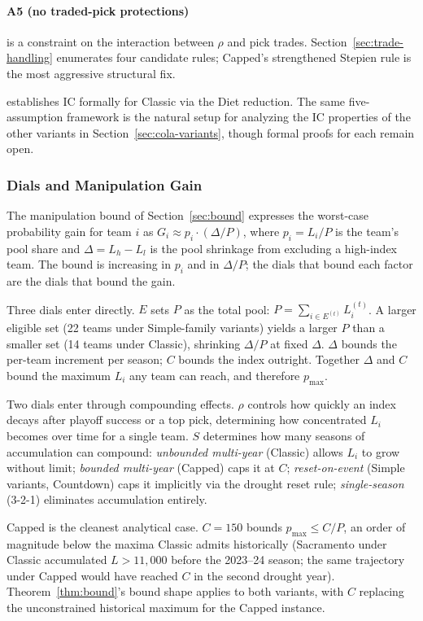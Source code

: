 \paragraph{A5 (no traded-pick protections)} is a constraint on the interaction between $\rho$ and pick trades. Section~\ref{sec:trade-handling} enumerates four candidate rules; Capped's strengthened Stepien rule is the most aggressive structural fix.

\citet{highley2026cola} establishes IC formally for Classic \cola{} via the Diet \cola{} reduction. The same five-assumption framework is the natural setup for analyzing the IC properties of the other variants in Section~\ref{sec:cola-variants}, though formal proofs for each remain open.

\subsubsection{Dials and Manipulation Gain}
\label{sec:dial-gain}

The manipulation bound of Section~\ref{sec:bound} expresses the worst-case probability gain for team $i$ as $G_i \approx p_i \cdot (\Delta / P)$, where $p_i = L_i / P$ is the team's pool share and $\Delta = L_h - L_l$ is the pool shrinkage from excluding a high-index team. The bound is increasing in $p_i$ and in $\Delta / P$; the dials that bound each factor are the dials that bound the gain.

Three dials enter directly. $E$ sets $P$ as the total pool: $P = \sum_{i \in E^{(t)}} L_i^{(t)}$. A larger eligible set (22 teams under Simple-family variants) yields a larger $P$ than a smaller set (14 teams under Classic), shrinking $\Delta / P$ at fixed $\Delta$. $\Delta$ bounds the per-team increment per season; $C$ bounds the index outright. Together $\Delta$ and $C$ bound the maximum $L_i$ any team can reach, and therefore $p_{\max}$.

Two dials enter through compounding effects. $\rho$ controls how quickly an index decays after playoff success or a top pick, determining how concentrated $L_i$ becomes over time for a single team. $S$ determines how many seasons of accumulation can compound: \emph{unbounded multi-year} (Classic) allows $L_i$ to grow without limit; \emph{bounded multi-year} (Capped) caps it at $C$; \emph{reset-on-event} (Simple variants, Countdown) caps it implicitly via the drought reset rule; \emph{single-season} (3-2-1) eliminates accumulation entirely.

Capped is the cleanest analytical case. $C = 150$ bounds $p_{\max} \leq C / P$, an order of magnitude below the maxima Classic admits historically (Sacramento under Classic accumulated $L > 11{,}000$ before the 2023--24 season; the same trajectory under Capped would have reached $C$ in the second drought year). Theorem~\ref{thm:bound}'s bound shape applies to both variants, with $C$ replacing the unconstrained historical maximum for the Capped instance.

